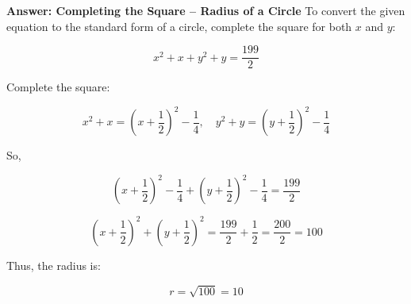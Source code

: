 \documentclass{beamer}
\begin{document}
\begin{frame}{\textbf{Answer: Completing the Square – Radius of a Circle}}
\small
To convert the given equation to the standard form of a circle, complete the square for both \(x\) and \(y\):

\[
x^2 + x + y^2 + y = \frac{199}{2}
\]

Complete the square:

\[
x^2 + x = \left(x + \frac{1}{2}\right)^2 - \frac{1}{4}, \quad y^2 + y = \left(y + \frac{1}{2}\right)^2 - \frac{1}{4}
\]

So,

\[
\left(x + \frac{1}{2}\right)^2 - \frac{1}{4} + \left(y + \frac{1}{2}\right)^2 - \frac{1}{4} = \frac{199}{2}
\]

\[
\left(x + \frac{1}{2}\right)^2 + \left(y + \frac{1}{2}\right)^2 = \frac{199}{2} + \frac{1}{2} = \frac{200}{2} = 100
\]

Thus, the radius is:

\[
r = \sqrt{100} = 10
\]
\end{frame}
\end{document}
